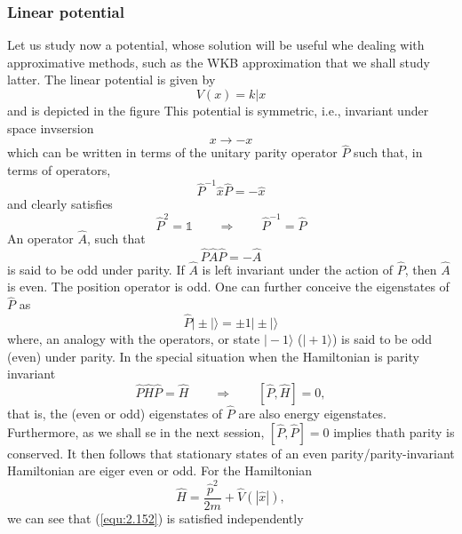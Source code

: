 \subsubsection{Linear potential}
Let us study now a potential, whose solution will be useful
whe dealing with approximative methods, such as the WKB
approximation that we shall study latter. The linear
potential is given by
\begin{equation}
  V(x) = k|x
  \label{equ:2.149}
\end{equation}
and is depicted in the figure %
This potential is symmetric, i.e., invariant under space
invsersion
$$
x \to -x
$$
which can be written in terms of the unitary parity operator
$\hat{P}$ such that, in terms of operators,
\begin{equation}
  \hat{P}^{-1} \hat{x} \hat{P} = - \hat{x}
  \label{equ:2.150}
\end{equation}
and clearly satisfies
\begin{equation}
  \hat{P}^2 = \mathbb{1} \qquad\Rightarrow\qquad
  \hat{P}^{-1} = \hat{P}
  \label{equ:2.151}
\end{equation}
An operator $\hat{A}$, such that
\begin{equation}
  \hat{P}\hat{A}\hat{P} = -\hat{A}
  \label{equ:2.152}
\end{equation}
is said to be odd under parity. If $\hat{A}$ is left invariant
under the action of $\hat{P}$, then $\hat{A}$ is even. The
position operator is odd.
One can further conceive the eigenstates of $\hat{P}$ as
\begin{equation}
  \hat{P} \vert \pm | \rangle = \pm 1 \vert \pm | \rangle
  \label{equ:2.153}
\end{equation}
where, an analogy with the operators, or state $\vert -1
\rangle$ ($\vert + 1 \rangle$) is said to be odd (even)
under parity.
In the special situation when the Hamiltonian is parity
invariant
\begin{equation}
  \hat{P} \hat{H} \hat{P} = \hat{H} \qquad \Rightarrow \qquad
  [\hat{P}, \hat{H}] = 0,
  \label{equ:2.154}
\end{equation}
that is, the (even or odd) eigenstates of $\hat{P}$ are also
energy eigenstates.
Furthermore, as we shall se in the next session, $[\hat{P},
\hat{P}] = 0$ implies thath parity is conserved. It then
follows that stationary states of an even
parity/parity-invariant Hamiltonian are eiger even or odd.
For the Hamiltonian
$$
\hat{H} = \frac{\hat{p}^2}{2m} + \hat{V}(|\hat{x}|),
$$
we can see that (\ref{equ:2.152}) is satisfied independently
